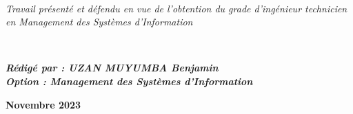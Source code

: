\begin{titlepage}
	\HRule\\[1.5cm]
	\hfill
	\begin{minipage}{0.6\linewidth}
		\textit{Travail présenté et défendu en vue de l’obtention
		du grade d’ingénieur technicien en Management des
		Systèmes d’Information}\\
	\end{minipage}
	\\
	\hfill
	\begin{minipage}{0.6\textwidth}
		\textit{\textbf{Rédigé par : UZAN MUYUMBA Benjamin}}
		\\
		\textit{\textbf{Option  : Management des Systèmes d’Information}}
	\end{minipage}
	
	
	\vfill\vfill\vfill %
	
	\textbf{Novembre 2023}
\end{titlepage}


